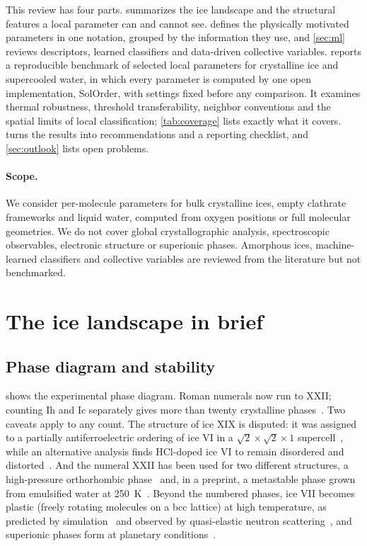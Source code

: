 \documentclass[11pt,a4paper]{article}
\begin{document}
This review has four parts.  summarizes the ice landscape
and the structural features a local parameter can and cannot see.
 defines the physically motivated parameters in one
notation, grouped by the information they use, and \cref{sec:ml} reviews
descriptors, learned classifiers and data-driven collective variables.
 reports a reproducible benchmark of selected local
parameters for crystalline ice and supercooled water, in which every
parameter is computed by one open implementation, SolOrder, with settings
fixed before any comparison. It examines thermal robustness, threshold
transferability, neighbor conventions and the spatial limits of local
classification; \cref{tab:coverage} lists exactly what it covers.
turns the results into recommendations and a reporting checklist, and
\cref{sec:outlook} lists open problems.

\paragraph{Scope.} We consider per-molecule parameters for bulk crystalline
ices, empty clathrate frameworks and liquid water, computed from oxygen
positions or full molecular geometries. We do not cover global
crystallographic analysis, spectroscopic observables, electronic structure or
superionic phases. Amorphous ices, machine-learned classifiers and
collective variables are reviewed from the literature but not benchmarked.

\section{The ice landscape in brief}\label{sec:phases}
\subsection{Phase diagram and stability}
 shows the experimental phase diagram. Roman numerals now run
to XXII; counting Ih and Ic separately gives more than twenty crystalline
phases~\cite{Salzmann_2019,Hansen2021,Gasser2022,Lee2025,Osmond2026}. Two
caveats apply to any count. The structure of ice XIX is disputed: it was
assigned to a partially antiferroelectric ordering of ice VI in a
$\sqrt2\times\sqrt2\times1$ supercell~\cite{Gasser2021,Yamane2021}, while an
alternative analysis finds HCl-doped ice VI to remain disordered and
distorted~\cite{Salzmann2021b}. And the numeral XXII has been used for two
different structures, a high-pressure orthorhombic phase~\cite{Osmond2026}
and, in a preprint, a metastable phase grown from emulsified water at
250~K~\cite{Kobayashi2025}. Beyond the numbered phases, ice VII becomes plastic
(freely rotating molecules on a bcc lattice) at high temperature, as predicted
by simulation~\cite{Aragones2009} and observed by quasi-elastic neutron
scattering~\cite{Rescigno2025}, and superionic phases form at planetary
conditions~\cite{Millot_2018,Millot2019,Prakapenka_2021,Cheng2021}.
\end{document}
